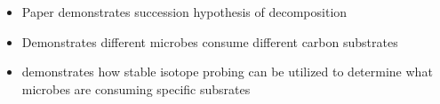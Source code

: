 
\begin{itemize}
\item Paper demonstrates succession hypothesis of decomposition
\item Demonstrates different microbes consume different carbon substrates
\item demonstrates how stable isotope probing can be utilized to determine what microbes are consuming specific subsrates
\end{itemize}


